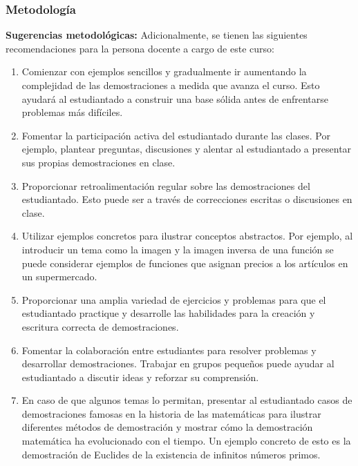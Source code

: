 \begin{refsection}
\begin{enumerate}
\end{enumerate}%

\subsubsection*{Metodología}



\textbf{Sugerencias metodológicas:} Adicionalmente, se tienen las siguientes recomendaciones para la persona docente a cargo de este curso:
\begin{enumerate}
    \item Comienzar con ejemplos sencillos y gradualmente ir aumentando la complejidad de las demostraciones a medida que avanza el curso. Esto ayudará al estudiantado a construir una base sólida antes de enfrentarse problemas más difíciles.
    \item Fomentar la participación activa del estudiantado durante las clases. Por ejemplo, plantear preguntas, discusiones y alentar al estudiantado a presentar sus propias demostraciones en clase.
    \item Proporcionar retroalimentación regular sobre las demostraciones del estudiantado. Esto puede ser a través de correcciones escritas o discusiones en clase.
    \item Utilizar ejemplos concretos para ilustrar conceptos abstractos. Por ejemplo, al introducir un tema como la imagen y la imagen inversa de una función se puede considerar ejemplos de funciones que asignan precios a los artículos en un supermercado.
    \item Proporcionar una amplia variedad de ejercicios y problemas para que el estudiantado practique y desarrolle las habilidades para la creación y escritura correcta de demostraciones.
    \item Fomentar la colaboración entre estudiantes para resolver problemas y desarrollar demostraciones. Trabajar en grupos pequeños puede ayudar al estudiantado a discutir ideas y reforzar su comprensión.
    \item En caso de que algunos temas lo permitan, presentar al estudiantado casos de demostraciones famosas en la historia de las matemáticas para ilustrar diferentes métodos de demostración y mostrar cómo la demostración matemática ha evolucionado con el tiempo. Un ejemplo concreto de esto es la demostración de Euclides de la existencia de infinitos números primos.
\end{enumerate}


\end{refsection}
